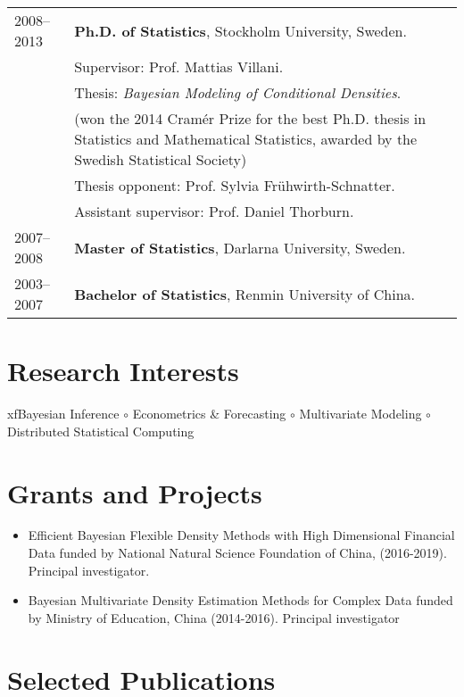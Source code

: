 \documentclass[twoside,a4paper,10pt]{amsart}
\begin{document}
\begin{tabular}{ l  p{} l}
  2008--2013 & \textbf{Ph.D. of Statistics}, Stockholm University, Sweden. \\
             & Supervisor: Prof. Mattias Villani.                          \\

             & Thesis: \emph{Bayesian Modeling of Conditional Densities}. \\
             & (won the 2014 Cramér Prize for the best Ph.D. thesis in Statistics and Mathematical Statistics, awarded by the Swedish Statistical Society) \\
             & Thesis opponent: Prof. Sylvia Frühwirth-Schnatter.               \\
             & Assistant supervisor: Prof. Daniel Thorburn.                     \\
  2007--2008 & \textbf{Master of Statistics}, Darlarna
               University, Sweden.                                             \\

 2003--2007 & \textbf{Bachelor of Statistics}, Renmin University of China. \\
\end{tabular}

\section*{Research Interests}

xfBayesian Inference $\circ$ Econometrics \& Forecasting $\circ$ Multivariate
Modeling $\circ$ Distributed Statistical Computing


\section*{Grants and Projects}
\begin{itemize}
\item Efficient Bayesian Flexible Density Methods with High Dimensional Financial Data
  funded by National Natural Science Foundation of China, (2016-2019). Principal investigator.

\item Bayesian Multivariate Density Estimation Methods for Complex Data funded by Ministry
  of Education, China (2014-2016). Principal investigator

\end{itemize}

\section*{Selected Publications}
\end{document}
